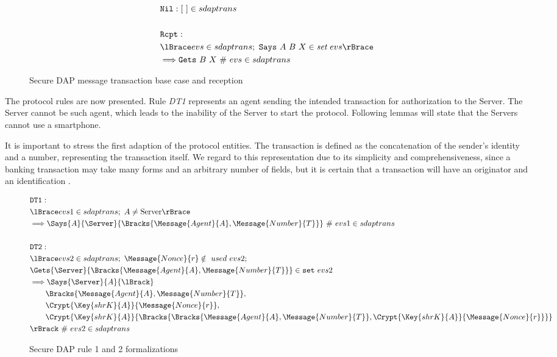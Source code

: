 \begin{figure}
  \begin{align*}
    & \texttt{Nil}: [ \ ] \in sdaptrans \\
    & \\
    & \texttt{Rcpt}: \newline \\
    & \lBrace evs \in sdaptrans;\ \texttt{Says} \ A \ B \ X \in \textit{set}\ evs \rBrace \\
    & \Longrightarrow \texttt{Gets} \ B \ X \ \#\ evs \in sdaptrans
  \end{align*}
  \label{fig:dap-model-0}
  \caption{Secure DAP message transaction base case and reception}
\end{figure}

The protocol rules are now presented. Rule \textit{DT1} represents an agent sending the intended transaction for authorization to the Server. The Server cannot be such agent, which leads to the inability of the Server to start the protocol. Following lemmas will state that the Servers cannot use a smartphone.

It is important to stress the first adaption of the protocol entities. The transaction is defined as the concatenation of the sender's identity and a number, representing the transaction itself. We regard to this representation due to its simplicity and comprehensiveness, since a banking transaction may take many forms and an arbitrary number of fields, but it is certain that a transaction will have an originator and an identification \cite{Hutchinson2003}.

\begin{figure}[h!]
  \begin{align*}
    & \texttt{DT1}: \\
    & \lBrace evs1 \in sdaptrans;\ A \neq \text{Server} \rBrace \\
    & \Longrightarrow \Says{A}{\Server}{\Bracks{\Message{Agent}{A}, \Message{Number}{T}}} \ \# \ evs1 \in sdaptrans \\
    & \\
    & \texttt{DT2}: \newline \\
    & \lBrace evs2 \in sdaptrans;\ \Message{Nonce}{r} \notin\ used\ evs2; \\
    & \Gets{\Server}{\Bracks{\Message{Agent}{A}, \Message{Number}{T}}} \in \texttt{set} \ evs2 \\
    & \Longrightarrow \Says{\Server}{A}{\lBrack} \\
    & \qquad \Bracks{\Message{Agent}{A}, \Message{Number}{T}}, \\
    & \qquad \Crypt{\Key{shrK}{A}}{\Message{Nonce}{r}}, \\
    & \qquad \Crypt{\Key{shrK}{A}}{\Bracks{\Bracks{\Message{Agent}{A}, \Message{Number}{T}}, \Crypt{\Key{shrK}{A}}{\Message{Nonce}{r}}}} \\
    & \rBrack \ \# \ evs2 \in sdaptrans
  \end{align*}
  \caption{Secure DAP rule 1 and 2 formalizations}
  \label{fig:dap-model-1-n-2}
\end{figure}

